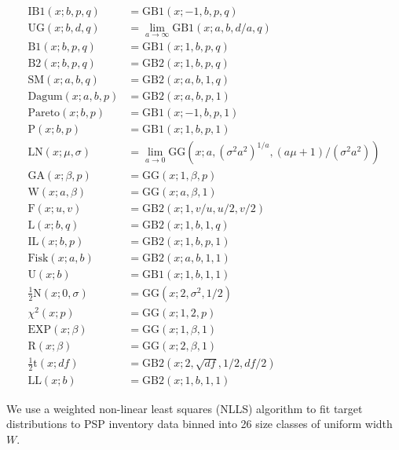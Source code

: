 \documentclass{article}
\begin{document}
\begin{align}
\text{IB1}(x; b, p, q) &= \text{GB1}(x; -1, b, p, q) \label{eq:distn_ib1} \\ 
\text{UG}(x; b, d, q) &= \lim_{a \to \infty} \text{GB1}(x; a, b, d/a, q) \\
\text{B1}(x; b, p, q) &= \text{GB1}(x; 1, b, p, q) \\
\text{B2}(x; b, p, q) &= \text{GB2}(x; 1, b, p, q) \\
\text{SM}(x; a, b, q) &= \text{GB2}(x; a, b, 1, q) \\
\text{Dagum}(x; a, b, p) &= \text{GB2}(x; a, b, p, 1) \\
\text{Pareto}(x; b, p) &= \text{GB1}(x; -1, b, p, 1) \\
\text{P}(x; b, p) &= \text{GB1}(x; 1, b, p, 1) \\
\text{LN}(x; \mu, \sigma) &= \lim_{a \to 0} \text{GG}(x; a, (\sigma^2 a^2)^{1/a}, (a\mu + 1)/(\sigma^2 a^2)) \\
\text{GA}(x; \beta, p) &= \text{GG}(x; 1, \beta, p) \\
\text{W}(x; a, \beta) &= \text{GG}(x; a, \beta, 1) \\
\text{F}(x; u, v) &= \text{GB2}(x; 1, v/u, u/2, v/2) \\
\text{L}(x; b, q) &= \text{GB2}(x; 1, b, 1, q) \\
\text{IL}(x; b, p) &= \text{GB2}(x; 1, b, p, 1) \\
\text{Fisk}(x; a, b) &= \text{GB2}(x; a, b, 1, 1) \\
\text{U}(x; b) &= \text{GB1}(x; 1, b, 1, 1) \\
\tfrac{1}{2}\text{N}(x; 0, \sigma) &= \text{GG}(x; 2, \sigma^2, 1/2) \\
\chi^2(x; p) &= \text{GG}(x; 1, 2, p) \\
\text{EXP}(x; \beta) &= \text{GG}(x; 1, \beta, 1) \\
\text{R}(x; \beta) &= \text{GG}(x; 2, \beta, 1) \\
\tfrac{1}{2}\text{t}(x; df) &= \text{GB2}(x; 2, \sqrt{df}, 1/2, df/2) \\
\text{LL}(x; b) &= \text{GB2}(x; 1, b, 1, 1) \label{eq:distn_ll}
\end{align}

We use a weighted non-linear least squares (NLLS) algorithm to fit target distributions to PSP inventory data binned into 26 size classes of uniform width $W$.
\end{document}
